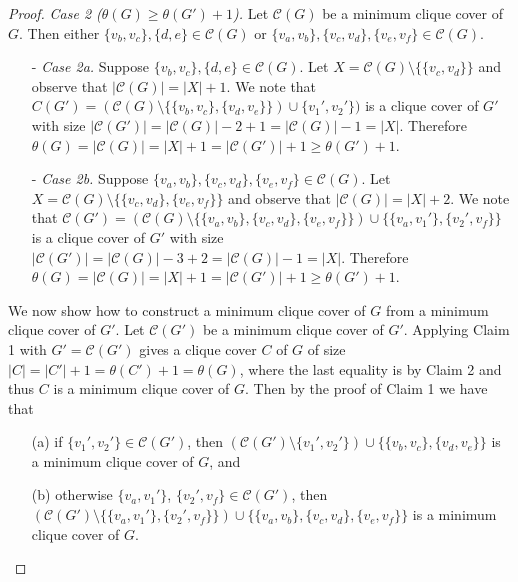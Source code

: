 \documentclass[../techreport.tex]{subfiles}
\begin{document}
\begin{proof}
	\noindent\emph{Case 2 ($\theta(G) \geq \theta(G') + 1$).} Let $\mathcal{C}(G)$ be a minimum clique cover of $G$. Then either $\{v_b, v_c\}, \{d, e\} \in \mathcal{C}(G)$ or $\{v_a, v_b\}, \{v_c, v_d\}, \{v_e, v_f\} \in \mathcal{C}(G)$.
	\begin{itemize}
		\item[-]\emph{Case 2a.} Suppose $\{v_b, v_c\}, \{d, e\} \in \mathcal{C}(G)$. Let $X = \mathcal{C}(G) \setminus \{\{v_c, v_d\}\}$ and observe that $|\mathcal{C}(G)| = |X| + 1$. We note that $C(G') = (\mathcal{C}(G) \setminus \{\{v_b, v_c\}, \{v_d, v_e\}\}) \cup \{v_1', v_2'\})$ is a clique cover of $G'$ with size $|\mathcal{C}(G')| = |\mathcal{C}(G)| - 2 + 1 = |\mathcal{C}(G)| - 1 = |X|$. Therefore $\theta(G) = |\mathcal{C}(G)| = |X| + 1 = |\mathcal{C}(G')| + 1 \geq \theta(G') + 1$.

		\item[-]\emph{Case 2b.} Suppose $\{v_a, v_b\}, \{v_c, v_d\}, \{v_e, v_f\} \in \mathcal{C}(G)$. Let $X = \mathcal{C}(G) \setminus \{\{v_c, v_d\}, \{v_e, v_f\}\}$ and observe that $|\mathcal{C}(G)| = |X| + 2$. We note that $\mathcal{C}(G') = (\mathcal{C}(G) \setminus \{\{v_a, v_b\}, \{v_c, v_d\}, \{v_e, v_f\}\}) \cup \{\{v_a, v_1'\}, \{v_2', v_f\}\}$ is a clique cover of $G'$ with size $|\mathcal{C}(G')| = |\mathcal{C}(G)| - 3 + 2 = |\mathcal{C}(G)| - 1 = |X|$. Therefore $\theta(G) = |\mathcal{C}(G)| = |X| + 1 = |\mathcal{C}(G')| + 1 \geq \theta(G') + 1$.
	\end{itemize}

	We now show how to construct a minimum clique cover of $G$ from a minimum clique cover of $G'$. Let $\mathcal{C}(G')$ be a minimum clique cover of $G'$. Applying Claim 1 with $G' = \mathcal{C}(G')$ gives a clique cover $C$ of $G$ of size $|C| = |C'| + 1 = \theta(C') + 1 = \theta(G)$, where the last equality is by Claim 2 and thus $C$ is a minimum clique cover of $G$. Then by the proof of Claim 1 we have that
	\begin{itemize}
		\item[(a)] if $\{v_1', v_2'\} \in \mathcal{C}(G')$, then $(\mathcal{C}(G') \setminus \{v_1', v_2'\}) \cup \{\{v_b, v_c\}, \{v_d, v_e\}\}$ is a minimum clique cover of $G$, and

		\item[(b)] otherwise $\{v_a, v_1'\}$, $\{v_2', v_f\} \in \mathcal{C}(G')$, then $(\mathcal{C}(G') \setminus \{\{v_a, v_1'\}, \{v_2', v_f\}\}) \cup \{\{v_a, v_b\}, \{v_c, v_d\}, \{v_e, v_f\}\}$ is a minimum clique cover of $G$.
	\end{itemize}
\end{proof}
\end{document}
